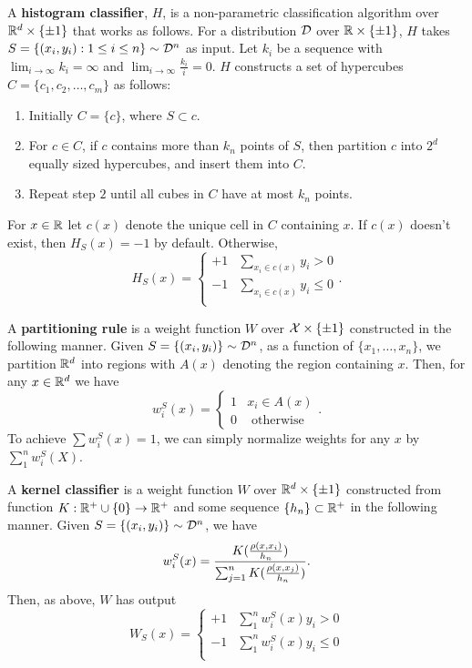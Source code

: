 \begin{defn}
A \textbf{histogram classifier}, $H$, is a non-parametric classification algorithm over $\mathbb R^d \times \{\pm 1\}$ that works as follows. For a distribution ${\mathcal D}$ over $\mathbb R \times \{\pm 1\}$, $H$ takes $S = \{(x_i, y_i): 1 \leq i \leq n\} \sim {\mathcal D}^n$ as input. Let $k_i$ be a sequence with $\lim_{i \to \infty} k_i = \infty$ and $\lim_{i \to \infty} \frac{k_i}{i} = 0$. $H$ constructs a set of hypercubes $C = \{c_1, c_2, \dots, c_m\}$ as follows:
\begin{enumerate}
	\item Initially $C = \{c\}$, where $S \subset c$.
	\item For $c \in C$, if $c$ contains more than $k_n$ points of $S$, then partition $c$ into $2^d$ equally sized hypercubes, and insert them into $C$.
	\item Repeat step $2$ until all cubes in $C$ have at most $k_n$ points. 
\end{enumerate}
For $x \in \mathbb R$ let $c(x)$ denote the unique cell in $C$ containing $x$. If $c(x)$ doesn't exist, then $H_S(x) = -1$ by default. Otherwise, \[ H_S(x) = \begin{cases} 
      +1 & \sum_{x_i \in c(x)} y_i > 0 \\
      -1 & \sum_{x_i \in c(x)}y_i \leq 0 \\
   \end{cases}.
\]
\end{defn}

\begin{defn}
A \textbf{partitioning rule} is a weight function $W$ over $\mathcal X \times \{\pm 1\}$ constructed in the following manner. Given $S = \{(x_i, y_i)\} \sim {\mathcal D}^n$, as a function of $\{x_1, \dots, x_n\}$, we partition $\mathbb R^d$ into regions with $A(x)$ denoting the region containing $x$.  Then, for any $x \in \mathbb R^d$ we have $$w_i^S(x) = \begin{cases}1 & x_i \in A(x) \\ 0 & \text{ otherwise}\end{cases}.$$To achieve $\sum w_i^S(x) = 1$, we can simply normalize weights for any $x$ by $\sum_1^n w_i^S(X)$.
\end{defn}

\begin{defn}
A \textbf{kernel classifier} is a weight function $W$ over $\mathbb R^d \times \{\pm 1\}$ constructed from function $K: \mathbb R^+ \cup \{0\} \to \mathbb R^+$ and some sequence $\{h_n\} \subset \mathbb R^+$ in the following manner. Given $S = \{(x_i, y_i)\} \sim {\mathcal D}^n$, we have $$w_i^S(x) = \frac{K(\frac{\rho(x, x_i)}{h_n})}{\sum_{j = 1}^n K(\frac{\rho(x, x_j)}{h_n})}.$$ Then, as above, $W$ has output \[ W_S(x) = \begin{cases} 
      +1 & \sum_1^n w_i^S(x)y_i > 0 \\
      -1 & \sum_1^n w_i^S(x)y_i \leq 0 \\
   \end{cases}
\]
\end{defn}

